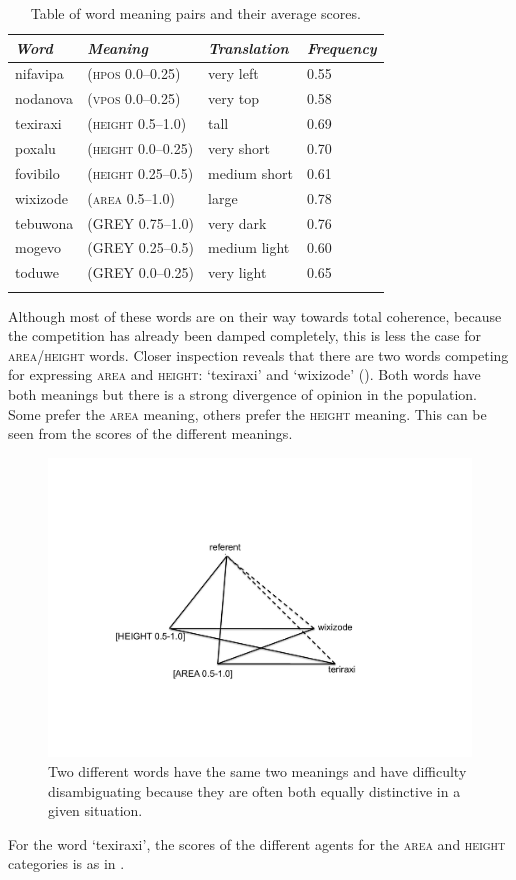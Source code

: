 \begin{table}[t]
\begin{center}
\begin{tabular}{ l  l  l  l }
\lsptoprule
{\itshape Word}&{\itshape Meaning}& {\itshape Translation} & {\itshape Frequency} \\ \midrule
nifavipa & (\textsc{hpos} 0.0–0.25) & very left & 0.55 \\ 
nodanova & (\textsc{vpos} 0.0–0.25) & very top & 0.58  \\ 
texiraxi & (\textsc{height} 0.5–1.0) & tall & 0.69  \\ 
poxalu & (\textsc{height} 0.0–0.25) & very short & 0.70  \\ 
fovibilo & (\textsc{height} 0.25–0.5) & medium short & 0.61  \\ 
wixizode & (\textsc{area} 0.5–1.0) & large & 0.78  \\ 
tebuwona & (GREY 0.75–1.0) & very dark & 0.76  \\ 
mogevo & (GREY 0.25–0.5) & medium light & 0.60  \\ 
toduwe & (GREY 0.0–0.25) & very light & 0.65  \\ 
\lspbottomrule
\end{tabular}
\caption{\label{tab:freq}Table of word meaning pairs and their average scores.}
\end{center}
\end{table}
Although most of these words are on their way towards
total coherence, because the competition has already 
been damped completely, this is less the case for 
\textsc{area}/\textsc{height} words. Closer inspection reveals that 
there are two words competing for expressing
\textsc{area} and \textsc{height}: `texiraxi' and `wixizode'
(). Both words have both meanings
but there is a strong divergence of opinion in the 
population. Some prefer the \textsc{area} meaning, others prefer
the \textsc{height} meaning. This can be seen from the scores of 
the different meanings.


\begin{figure}[b]
  \centerline{\includegraphics[width=.60\textwidth]{chap6/figs/triangle7.pdf}}
\caption{\label{triangle7}Two different words have the 
same two meanings and have difficulty disambiguating because
they are often both equally distinctive in a given situation.}
\end{figure}
For the word `texiraxi', the scores of the different 
agents for the \textsc{area} and \textsc{height} categories is as in . 


